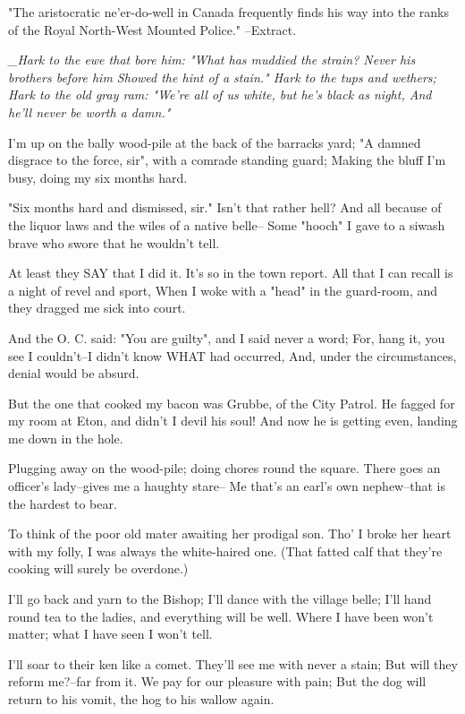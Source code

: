 
\begin{poemblock}
 "The aristocratic ne'er-do-well in Canada frequently finds his way
 into the ranks of the Royal North-West Mounted Police." --Extract.


\textit{
  _Hark to the ewe that bore him:
   "What has muddied the strain?
  Never his brothers before him
   Showed the hint of a stain."
  Hark to the tups and wethers;
   Hark to the old gray ram:
  "We're all of us white, but he's black as night,
   And he'll never be worth a damn."
}

 I'm up on the bally wood-pile at the back of the barracks yard;
 "A damned disgrace to the force, sir", with a comrade standing guard;
 Making the bluff I'm busy, doing my six months hard.

 "Six months hard and dismissed, sir."  Isn't that rather hell?
 And all because of the liquor laws and the wiles of a native belle--
 Some "hooch" I gave to a siwash brave who swore that he wouldn't tell.

 At least they SAY that I did it.  It's so in the town report.
 All that I can recall is a night of revel and sport,
 When I woke with a "head" in the guard-room,
   and they dragged me sick into court.

 And the O. C. said:  "You are guilty", and I said never a word;
 For, hang it, you see I couldn't--I didn't know WHAT had occurred,
 And, under the circumstances, denial would be absurd.

 But the one that cooked my bacon was Grubbe, of the City Patrol.
 He fagged for my room at Eton, and didn't I devil his soul!
 And now he is getting even, landing me down in the hole.

 Plugging away on the wood-pile; doing chores round the square.
 There goes an officer's lady--gives me a haughty stare--
 Me that's an earl's own nephew--that is the hardest to bear.

 To think of the poor old mater awaiting her prodigal son.
 Tho' I broke her heart with my folly, I was always the white-haired one.
 (That fatted calf that they're cooking will surely be overdone.)

 I'll go back and yarn to the Bishop; I'll dance with the village belle;
 I'll hand round tea to the ladies, and everything will be well.
 Where I have been won't matter; what I have seen I won't tell.

 I'll soar to their ken like a comet.  They'll see me with never a stain;
 But will they reform me?--far from it.  We pay for our pleasure with pain;
 But the dog will return to his vomit, the hog to his wallow again.


\end{poemblock}
